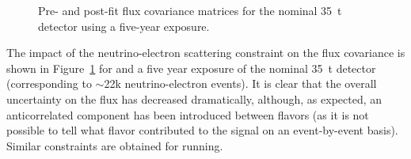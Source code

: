 \begin{figure}[htbp]
  \centering
  \caption[ flux covariance matrices for nominal \SI{35}{t} ]{Pre- and post-fit  flux covariance matrices for the nominal \SI{35}{t}   detector using a five-year exposure.}
  \label{fig:LAR_nominal_covariances}
\end{figure}
The impact of the neutrino-electron scattering constraint on the flux covariance is shown in Figure~\ref{fig:LAR_nominal_covariances} for  and a five year exposure of the nominal \SI{35}{t}   detector (corresponding to $\sim$22k neutrino-electron events). It is clear that the overall uncertainty on the flux has decreased dramatically, although, as expected, an anticorrelated component has been introduced between flavors (as it is not possible to tell what flavor contributed to the signal on an event-by-event basis). Similar constraints are obtained for  running.

